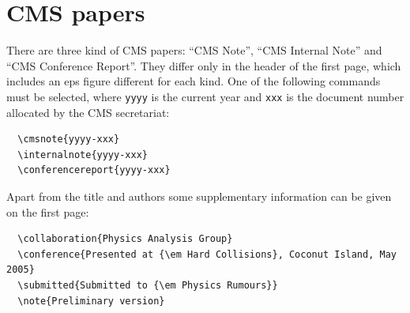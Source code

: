 \documentclass{cmspaper}
\begin{document}
%
%
%
%
%  
%

\section{CMS papers}

    There are three kind of CMS papers: ``CMS Note'', 
    ``CMS Internal Note'' and ``CMS Conference Report''.
    They differ only in the header of the first page,
    which includes an eps figure different for each kind.
    One of the following commands must be selected,
    where \verb$yyyy$ is the current year
    and \verb$xxx$ is the document number allocated by the CMS secretariat:
{\small \begin{verbatim}
  \cmsnote{yyyy-xxx}
  \internalnote{yyyy-xxx}
  \conferencereport{yyyy-xxx}
\end{verbatim} }
    
Apart from the title and authors some supplementary information can be given
on the first page:
{\small \begin{verbatim}
  \collaboration{Physics Analysis Group}
  \conference{Presented at {\em Hard Collisions}, Coconut Island, May 2005}
  \submitted{Submitted to {\em Physics Rumours}}
  \note{Preliminary version}
\end{verbatim} }
\end{document}
